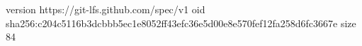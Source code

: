 version https://git-lfs.github.com/spec/v1
oid sha256:c204c5116b3dcbbb5ec1e8052ff43efc36e5d00e8e570fef12fa258d6fc3667e
size 84
